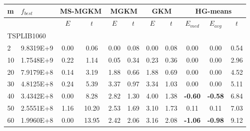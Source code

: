 {\footnotesize
\centering
\begin{longtable}{@{}llccccccccc@{}}
\hline
\multicolumn{1}{l|}{m}   & \multicolumn{1}{l|}{$f_{best}$} & \multicolumn{2}{c|}{MS-MGKM}        & \multicolumn{2}{c|}{MGKM}           & \multicolumn{2}{c|}{GKM}            & \multicolumn{3}{c}{HG-means}                  \\ \hline
                         & \multicolumn{1}{l|}{}           & $E$  & \multicolumn{1}{c|}{$t$}     & $E$  & \multicolumn{1}{c|}{$t$}     & $E$  & \multicolumn{1}{c|}{$t$}     & $E_{med}$      & $E_{avg}$      & $t$     \\ \hline
\multicolumn{11}{l}{TSPLIB1060}                                                                                                                                                                                          \\ \hline
\multicolumn{1}{l|}{2}   & \multicolumn{1}{l|}{9.8319E+9}  & 0.00 & \multicolumn{1}{c|}{0.06}    & 0.00 & \multicolumn{1}{c|}{0.08}    & 0.00 & \multicolumn{1}{c|}{0.08}    & 0.00           & 0.00           & 0.54    \\
\multicolumn{1}{l|}{10}  & \multicolumn{1}{l|}{1.7548E+9}  & 0.22 & \multicolumn{1}{c|}{1.14}    & 0.05 & \multicolumn{1}{c|}{0.34}    & 0.23 & \multicolumn{1}{c|}{0.36}    & 0.00           & 0.00           & 2.96    \\
\multicolumn{1}{l|}{20}  & \multicolumn{1}{l|}{7.9179E+8}  & 0.14 & \multicolumn{1}{c|}{3.19}    & 1.88 & \multicolumn{1}{c|}{0.66}    & 1.88 & \multicolumn{1}{c|}{0.69}    & 0.00           & 0.00           & 4.52    \\
\multicolumn{1}{l|}{30}  & \multicolumn{1}{l|}{4.8125E+8}  & 0.24 & \multicolumn{1}{c|}{5.39}    & 3.37 & \multicolumn{1}{c|}{0.97}    & 3.34 & \multicolumn{1}{c|}{1.03}    & 0.00           & 0.00           & 5.11    \\
\multicolumn{1}{l|}{40}  & \multicolumn{1}{l|}{3.4342E+8}  & 0.00 & \multicolumn{1}{c|}{8.28}    & 2.82 & \multicolumn{1}{c|}{1.30}    & 4.00 & \multicolumn{1}{c|}{1.38}    & \textbf{-0.60} & \textbf{-0.58} & 6.84    \\
\multicolumn{1}{l|}{50}  & \multicolumn{1}{l|}{2.5551E+8}  & 1.16 & \multicolumn{1}{c|}{10.20}   & 2.53 & \multicolumn{1}{c|}{1.69}    & 3.10 & \multicolumn{1}{c|}{1.73}    & 0.11           & 0.11           & 7.03    \\
\multicolumn{1}{l|}{60}  & \multicolumn{1}{l|}{1.9960E+8}  & 0.00 & \multicolumn{1}{c|}{13.95}   & 2.42 & \multicolumn{1}{c|}{2.06}    & 3.16 & \multicolumn{1}{c|}{2.08}    & \textbf{-1.06} & \textbf{-0.98} & 9.12    \\

\end{longtable}}
